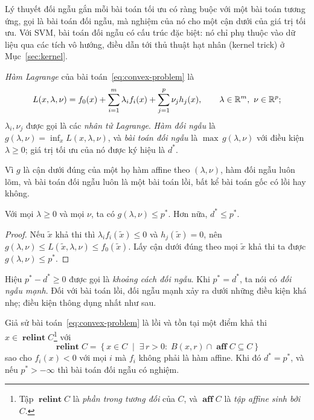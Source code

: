 Lý thuyết đối ngẫu gắn mỗi bài toán tối ưu có ràng buộc với một bài toán tương ứng, gọi là bài toán đối ngẫu, mà nghiệm của nó cho một cận dưới của giá trị tối ưu. Với SVM, bài toán đối ngẫu có cấu trúc đặc biệt: nó chỉ phụ thuộc vào dữ liệu qua các tích vô hướng, điều dẫn tới thủ thuật hạt nhân (kernel trick) ở Mục~\ref{sec:kernel}.

\begin{definition}\label{def:lagrangian}
\emph{Hàm Lagrange} của bài toán~\eqref{eq:convex-problem} là
\[
L(x,\lambda,\nu)=f_0(x)+\sum_{i=1}^{m}\lambda_if_i(x)+\sum_{j=1}^{p}\nu_jh_j(x),\qquad\lambda\in\R^m,\ \nu\in\R^p;
\]
$\lambda_i,\nu_j$ được gọi là các \emph{nhân tử Lagrange}. \emph{Hàm đối ngẫu} là $g(\lambda,\nu)=\inf_xL(x,\lambda,\nu)$, và \emph{bài toán đối ngẫu} là $\max\,g(\lambda,\nu)$ với điều kiện $\lambda\ge0$; giá trị tối ưu của nó được ký hiệu là $d^\ast$.
\end{definition}

Vì $g$ là cận dưới đúng của một họ hàm affine theo $(\lambda,\nu)$, hàm đối ngẫu luôn lõm, và bài toán đối ngẫu luôn là một bài toán lồi, bất kể bài toán gốc có lồi hay không.

\begin{proposition}\label{prop:weak-duality}
Với mọi $\lambda\ge0$ và mọi $\nu$, ta có $g(\lambda,\nu)\le p^\ast$. Hơn nữa, $d^\ast\le p^\ast$.
\end{proposition}

\begin{proof}
Nếu $\tilde x$ khả thi thì $\lambda_if_i(\tilde x)\le0$ và $h_j(\tilde x)=0$, nên $g(\lambda,\nu)\le L(\tilde x,\lambda,\nu)\le f_0(\tilde x)$. Lấy cận dưới đúng theo mọi $\tilde x$ khả thi ta được $g(\lambda,\nu)\le p^\ast$.
\end{proof}

Hiệu $p^\ast-d^\ast\ge0$ được gọi là \emph{khoảng cách đối ngẫu}. Khi $p^\ast=d^\ast$, ta nói có \emph{đối ngẫu mạnh}. Đối với bài toán lồi, đối ngẫu mạnh xảy ra dưới những điều kiện khá nhẹ; điều kiện thông dụng nhất như sau.

\begin{theorem}\label{thm:slater}
Giả sử bài toán~\eqref{eq:convex-problem} là lồi và tồn tại một điểm khả thi $x \in \operatorname{\textbf{relint}} C$\footnote{Tập $\operatorname{\textbf{relint}} C$ là \emph{phần trong tương đối} của $C$, và $\operatorname{\textbf{aff}} C$ là \emph{tập affine sinh bởi $C$}.} với  
\[
\operatorname{\textbf{relint}} C = \left\{ x \in C \;\middle|\; \exists\, r>0:\; B(x,r)\cap \operatorname{\textbf{aff}} C \subseteq C \right\}
\]
 sao cho $f_i(x)<0$ với mọi $i$ mà $f_i$ không phải là hàm affine. Khi đó $d^\ast=p^\ast$, và nếu $p^\ast>-\infty$ thì bài toán đối ngẫu có nghiệm.
\end{theorem}

